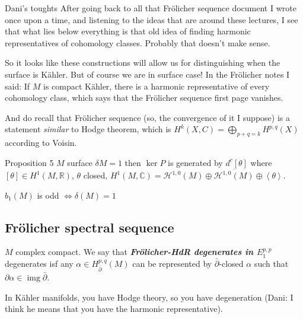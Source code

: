 \begin{thing6}{Dani's toughts}\leavevmode
After going back to all that Frölicher sequence document I wrote once upon a time, and listening to the ideas that are around these lectures, I see that what lies below everything is that old idea of finding harmonic representatives of cohomology classes. Probably that doesn't make sense.

So it looks like these constructions will allow us for distinguishing when the surface is Kähler. But of course we are in surface case! In the Frölicher notes I said: If \(M\) is compact Kähler, there is a harmonic representative of every cohomology class, which says that the Frölicher sequence first page vanishes.

And do recall that Frölicher sequence (so, the convergence of it I suppose) is a statement \textit{similar } to Hodge theorem, which is \(H^{k}(X,C)= \bigoplus_{p+q=k}H^{p,q}(X)\) according to Voisin.
\end{thing6}

\begin{thing7}{Proposition 5}\leavevmode
\(M\) surface \(\delta M=1\) then \(\ker P\) is generated by \(d^c[\theta]\) where \([\theta] \in H^{1}(M,\mathbb{R})\), \(\theta\) closed, \(H^{1}(M,\mathbb{C})=\mathcal{H}^{1,0}(M) \oplus  \overline{\mathcal{H}^{1,0}(M)} \oplus  \left< \theta\right>\).
\end{thing7}

\begin{coro}\leavevmode
\(b_1(M)\) is odd \(\iff \delta(M)=1\)
\end{coro}

\begin{coro}\leavevmode

\end{coro}

\subsection{Frölicher spectral sequence}

\begin{defn}\leavevmode
\(M\) complex compact. We say that \textit{\textbf{Frölicher-HdR degenerates in \(E^{p ,p}_1\)}}  degenerates isf any \(\alpha \in H^{p,q}_{\bar{\partial}}(M)\) can be represented by \(\bar\partial\)-closed \(\alpha\) such that \(\partial  \alpha \in \operatorname{img} \bar\partial\).
\end{defn}

\begin{remark}\leavevmode
In Kähler manifolds, you have Hodge theory, so you have degeneration (Dani: I think he means that you have the harmonic representative).
\end{remark}

